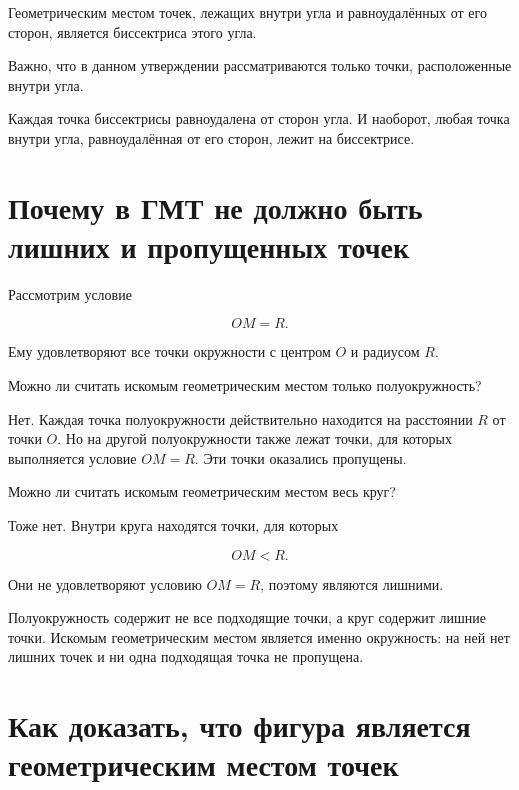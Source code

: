 	\gmtbisectorfigure

	\begin{propertybox}
		Геометрическим местом точек, лежащих внутри угла и равноудалённых
		от его сторон, является биссектриса этого угла.
	\end{propertybox}
	
	\begin{notebox}
		Важно, что в данном утверждении рассматриваются только точки,
		расположенные внутри угла.
	\end{notebox}
	
		Каждая точка биссектрисы равноудалена от сторон угла.
	И наоборот, любая точка внутри угла, равноудалённая от его сторон,
	лежит на биссектрисе.
	
	\section{Почему в ГМТ не должно быть лишних и пропущенных точек}
	
	Рассмотрим условие
	
	\[
	OM=R.
	\]
	
	Ему удовлетворяют все точки окружности с центром \(O\) и радиусом \(R\).
	
	Можно ли считать искомым геометрическим местом только полуокружность?
	
	Нет. Каждая точка полуокружности действительно находится на расстоянии \(R\)
		от точки \(O\). Но на другой полуокружности также лежат точки,
	для которых выполняется условие \(OM=R\). Эти точки оказались пропущены.
	
	Можно ли считать искомым геометрическим местом весь круг?
	
	Тоже нет. Внутри круга находятся точки, для которых
	
	\[
	OM<R.
	\]
	
	Они не удовлетворяют условию \(OM=R\), поэтому являются лишними.

	\gmtextraandmissingpointsfigure
	
	\begin{importantbox}
		Полуокружность содержит не все подходящие точки, а круг содержит лишние точки.
		Искомым геометрическим местом является именно окружность:
		на ней нет лишних точек и ни одна подходящая точка не пропущена.
	\end{importantbox}
	
	\section{Как доказать, что фигура является геометрическим местом точек}
	

